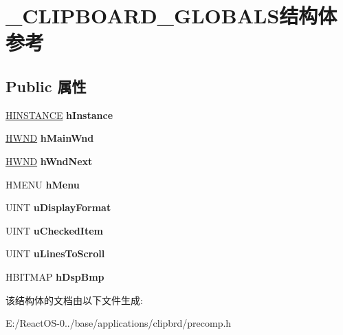 \hypertarget{struct___c_l_i_p_b_o_a_r_d___g_l_o_b_a_l_s}{}\section{\+\_\+\+C\+L\+I\+P\+B\+O\+A\+R\+D\+\_\+\+G\+L\+O\+B\+A\+L\+S结构体 参考}
\label{struct___c_l_i_p_b_o_a_r_d___g_l_o_b_a_l_s}
\subsection*{Public 属性}
\begin{DoxyCompactItemize}
\item 
\mbox{\label{struct___c_l_i_p_b_o_a_r_d___g_l_o_b_a_l_s_a25bf0a57e93fcab17c9ae727d0130f5b}} 
\hyperlink{interfacevoid}{H\+I\+N\+S\+T\+A\+N\+CE} {\bfseries h\+Instance}
\item 
\mbox{\label{struct___c_l_i_p_b_o_a_r_d___g_l_o_b_a_l_s_a1d9e467b0db240074fe85e157b4b431d}} 
\hyperlink{interfacevoid}{H\+W\+ND} {\bfseries h\+Main\+Wnd}
\item 
\mbox{\label{struct___c_l_i_p_b_o_a_r_d___g_l_o_b_a_l_s_a25133d4ac05f071b704bc6088b80035f}} 
\hyperlink{interfacevoid}{H\+W\+ND} {\bfseries h\+Wnd\+Next}
\item 
\mbox{\label{struct___c_l_i_p_b_o_a_r_d___g_l_o_b_a_l_s_ae1f2b9e2cbb264f20dc9770a521ad3b1}} 
H\+M\+E\+NU {\bfseries h\+Menu}
\item 
\mbox{\label{struct___c_l_i_p_b_o_a_r_d___g_l_o_b_a_l_s_ac21cef0cbb16e35f62414da291dec684}} 
U\+I\+NT {\bfseries u\+Display\+Format}
\item 
\mbox{\label{struct___c_l_i_p_b_o_a_r_d___g_l_o_b_a_l_s_a37b8f8d4c8e498b5ed369ed15ce60f07}} 
U\+I\+NT {\bfseries u\+Checked\+Item}
\item 
\mbox{\label{struct___c_l_i_p_b_o_a_r_d___g_l_o_b_a_l_s_a3084f99e4ba8cbebcf07a3ca1a177ff1}} 
U\+I\+NT {\bfseries u\+Lines\+To\+Scroll}
\item 
\mbox{\label{struct___c_l_i_p_b_o_a_r_d___g_l_o_b_a_l_s_a43ec73376251ceabf396d61ac681bcec}} 
H\+B\+I\+T\+M\+AP {\bfseries h\+Dsp\+Bmp}
\end{DoxyCompactItemize}


该结构体的文档由以下文件生成\+:\begin{DoxyCompactItemize}
\item 
E\+:/\+React\+O\+S-\/0../base/applications/clipbrd/precomp.\+h\end{DoxyCompactItemize}
